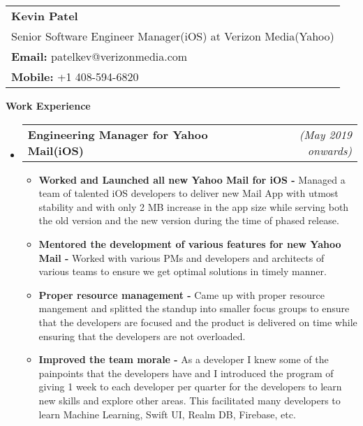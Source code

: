\documentclass[a4paper,11pt,times]{res}
\makeatletter
\newcommand{\smalitem}[1]{\item #1 \vspace{-4pt}}
\newcommand{\resheading}[1]{{\large \colorbox{mygrey}{\begin{minipage}{\textwidth}{\textbf{#1 \vphantom{p\^{E}}}}\end{minipage}}\vspace{4pt}}}
\newcommand{\mysubheading}[2]{
\begin{tabular*}{172mm}{l@{\extracolsep{\fill}}r}
		\textbf{#1} & \textit{#2} \\
\end{tabular*}\vspace{-1pt}}
\makeatother
\begin{document}
\vspace{-2pt}
\begin{tabular*}{160mm}{l}
\textbf{Kevin Patel} \\
Senior Software Engineer Manager(iOS) at Verizon Media(Yahoo) \\
\textbf{Email:} patelkev@verizonmedia.com \\
\textbf{Mobile:} +1 408-594-6820 \\
\end{tabular*}

\resheading{Work Experience}
\begin{itemize}

\item
\mysubheading{Engineering Manager for Yahoo Mail(iOS) }{(May 2019 onwards)}
\begin{itemize}
\vspace{-2pt}
\smalitem{\textbf{Worked and Launched all new Yahoo Mail for iOS -} Managed a team of talented iOS developers to deliver new Mail App with utmost stability and with only 2 MB increase in the app size while serving both the old version and the new version during the time of phased release.}
\smalitem{\textbf{Mentored the development of various features for new Yahoo Mail -} Worked with various PMs and developers and architects of various teams to ensure we get optimal solutions in timely manner.}
\smalitem{\textbf{Proper resource management -} Came up with proper resource mangement and splitted the standup into smaller focus groups to ensure that the developers are focused and the product is delivered on time while ensuring that the developers are not overloaded.}
\smalitem{\textbf{Improved the team morale -} As a developer I knew some of the painpoints that the developers have and I introduced the program of giving 1 week to each developer per quarter for the developers to learn new skills and explore other areas. This facilitated many developers to learn Machine Learning, Swift UI, Realm DB, Firebase, etc.}


\end{itemize}

\vspace{2pt}


\end{itemize}
\end{document}
